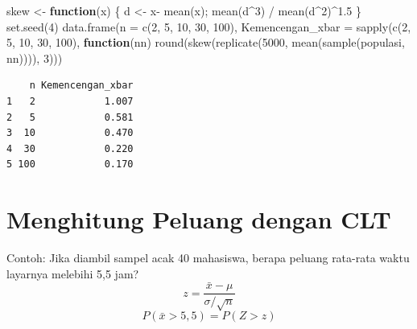 \documentclass[
  indonesian,
  letterpaper,
]{book}
\newenvironment{Shaded}{\begin{snugshade}}{\end{snugshade}}
\newcommand{\AttributeTok}[1]{\textcolor[rgb]{0.40,0.45,0.13}{#1}}
\newcommand{\ControlFlowTok}[1]{\textcolor[rgb]{0.00,0.23,0.31}{\textbf{#1}}}
\newcommand{\DecValTok}[1]{\textcolor[rgb]{0.68,0.00,0.00}{#1}}
\newcommand{\FloatTok}[1]{\textcolor[rgb]{0.68,0.00,0.00}{#1}}
\newcommand{\FunctionTok}[1]{\textcolor[rgb]{0.28,0.35,0.67}{#1}}
\newcommand{\NormalTok}[1]{\textcolor[rgb]{0.00,0.23,0.31}{#1}}
\newcommand{\OtherTok}[1]{\textcolor[rgb]{0.00,0.23,0.31}{#1}}
\newcommand{\SpecialCharTok}[1]{\textcolor[rgb]{0.37,0.37,0.37}{#1}}
\begin{document}
\begin{Shaded}
\begin{Highlighting}[]
\NormalTok{skew }\OtherTok{\textless{}{-}} \ControlFlowTok{function}\NormalTok{(x) \{ d }\OtherTok{\textless{}{-}}\NormalTok{ x}\SpecialCharTok{{-}} \FunctionTok{mean}\NormalTok{(x); }\FunctionTok{mean}\NormalTok{(d}\SpecialCharTok{\^{}}\DecValTok{3}\NormalTok{) }\SpecialCharTok{/} \FunctionTok{mean}\NormalTok{(d}\SpecialCharTok{\^{}}\DecValTok{2}\NormalTok{)}\SpecialCharTok{\^{}}\FloatTok{1.5}\NormalTok{ \}}
\FunctionTok{set.seed}\NormalTok{(}\DecValTok{4}\NormalTok{)}
\FunctionTok{data.frame}\NormalTok{(}\AttributeTok{n =} \FunctionTok{c}\NormalTok{(}\DecValTok{2}\NormalTok{, }\DecValTok{5}\NormalTok{, }\DecValTok{10}\NormalTok{, }\DecValTok{30}\NormalTok{, }\DecValTok{100}\NormalTok{),}
\AttributeTok{Kemencengan\_xbar =} \FunctionTok{sapply}\NormalTok{(}\FunctionTok{c}\NormalTok{(}\DecValTok{2}\NormalTok{, }\DecValTok{5}\NormalTok{, }\DecValTok{10}\NormalTok{, }\DecValTok{30}\NormalTok{, }\DecValTok{100}\NormalTok{), }\ControlFlowTok{function}\NormalTok{(nn)}
\FunctionTok{round}\NormalTok{(}\FunctionTok{skew}\NormalTok{(}\FunctionTok{replicate}\NormalTok{(}\DecValTok{5000}\NormalTok{, }\FunctionTok{mean}\NormalTok{(}\FunctionTok{sample}\NormalTok{(populasi, nn)))), }\DecValTok{3}\NormalTok{)))}
\end{Highlighting}
\end{Shaded}

\begin{verbatim}
    n Kemencengan_xbar
1   2            1.007
2   5            0.581
3  10            0.470
4  30            0.220
5 100            0.170
\end{verbatim}

\section{Menghitung Peluang dengan
CLT}\label{menghitung-peluang-dengan-clt}

Contoh: Jika diambil sampel acak 40 mahasiswa, berapa peluang rata-rata
waktu layarnya melebihi 5,5 jam?
\[                                                
z = \frac{\bar{x} - \mu}{\sigma/\sqrt{n}}     
\] \[
P(\bar{x} > 5{,}5) = P(Z > z)
\]
\end{document}
